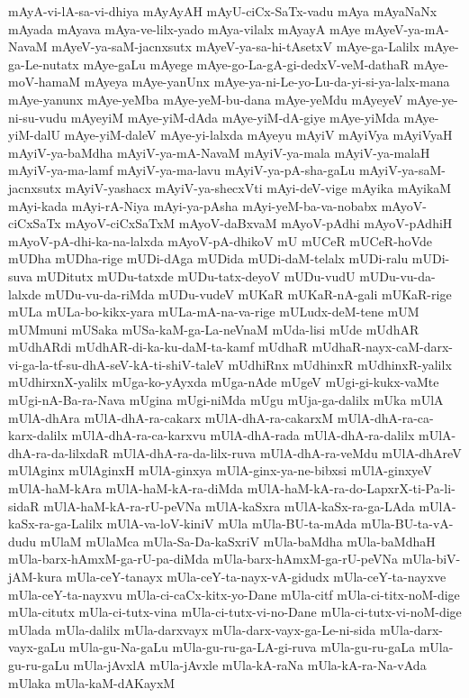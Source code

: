 {mAyA-vi-lA-sa-vi-dhiya
mAyAyAH
mAyU-ciCx-SaTx-vadu
mAya
mAyaNaNx
mAyada
mAyava
mAya-ve-lilx-yado
mAya-vilalx
mAyayA
mAye
mAyeV-ya-mA-NavaM
mAyeV-ya-saM-jacnxsutx
mAyeV-ya-sa-hi-tAsetxV
mAye-ga-Lalilx
mAye-ga-Le-nutatx
mAye-gaLu
mAyege
mAye-go-La-gA-gi-dedxV-veM-dathaR
mAye-moV-hamaM
mAyeya
mAye-yanUnx
mAye-ya-ni-Le-yo-Lu-da-yi-si-ya-lalx-mana
mAye-yanunx
mAye-yeMba
mAye-yeM-bu-dana
mAye-yeMdu
mAyeyeV
mAye-ye-ni-su-vudu
mAyeyiM
mAye-yiM-dAda
mAye-yiM-dA-giye
mAye-yiMda
mAye-yiM-dalU
mAye-yiM-daleV
mAye-yi-lalxda
mAyeyu
mAyiV
mAyiVya
mAyiVyaH
mAyiV-ya-baMdha
mAyiV-ya-mA-NavaM
mAyiV-ya-mala
mAyiV-ya-malaH
mAyiV-ya-ma-lamf
mAyiV-ya-ma-lavu
mAyiV-ya-pA-sha-gaLu
mAyiV-ya-saM-jacnxsutx
mAyiV-yashacx
mAyiV-ya-shecxVti
mAyi-deV-vige
mAyika
mAyikaM
mAyi-kada
mAyi-rA-Niya
mAyi-ya-pAsha
mAyi-yeM-ba-va-nobabx
mAyoV-ciCxSaTx
mAyoV-ciCxSaTxM
mAyoV-daBxvaM
mAyoV-pAdhi
mAyoV-pAdhiH
mAyoV-pA-dhi-ka-na-lalxda
mAyoV-pA-dhikoV
mU
mUCeR
mUCeR-hoVde
mUDha
mUDha-rige
mUDi-dAga
mUDida
mUDi-daM-telalx
mUDi-ralu
mUDi-suva
mUDitutx
mUDu-tatxde
mUDu-tatx-deyoV
mUDu-vudU
mUDu-vu-da-lalxde
mUDu-vu-da-riMda
mUDu-vudeV
mUKaR
mUKaR-nA-gali
mUKaR-rige
mULa
mULa-bo-kikx-yara
mULa-mA-na-va-rige
mULudx-deM-tene
mUM
mUMmuni
mUSaka
mUSa-kaM-ga-La-neVnaM
mUda-lisi
mUde
mUdhAR
mUdhARdi
mUdhAR-di-ka-ku-daM-ta-kamf
mUdhaR
mUdhaR-nayx-caM-darx-vi-ga-la-tf-su-dhA-seV-kA-ti-shiV-taleV
mUdhiRnx
mUdhinxR
mUdhinxR-yalilx
mUdhirxnX-yalilx
mUga-ko-yAyxda
mUga-nAde
mUgeV
mUgi-gi-kukx-vaMte
mUgi-nA-Ba-ra-Nava
mUgina
mUgi-niMda
mUgu
mUja-ga-dalilx
mUka
mUlA
mUlA-dhAra
mUlA-dhA-ra-cakarx
mUlA-dhA-ra-cakarxM
mUlA-dhA-ra-ca-karx-dalilx
mUlA-dhA-ra-ca-karxvu
mUlA-dhA-rada
mUlA-dhA-ra-dalilx
mUlA-dhA-ra-da-lilxdaR
mUlA-dhA-ra-da-lilx-ruva
mUlA-dhA-ra-veMdu
mUlA-dhAreV
mUlAginx
mUlAginxH
mUlA-ginxya
mUlA-ginx-ya-ne-bibxsi
mUlA-ginxyeV
mUlA-haM-kAra
mUlA-haM-kA-ra-diMda
mUlA-haM-kA-ra-do-LapxrX-ti-Pa-li-sidaR
mUlA-haM-kA-ra-rU-peVNa
mUlA-kaSxra
mUlA-kaSx-ra-ga-LAda
mUlA-kaSx-ra-ga-Lalilx
mUlA-va-loV-kiniV
mUla
mUla-BU-ta-mAda
mUla-BU-ta-vA-dudu
mUlaM
mUlaMca
mUla-Sa-Da-kaSxriV
mUla-baMdha
mUla-baMdhaH
mUla-barx-hAmxM-ga-rU-pa-diMda
mUla-barx-hAmxM-ga-rU-peVNa
mUla-biV-jAM-kura
mUla-ceY-tanayx
mUla-ceY-ta-nayx-vA-gidudx
mUla-ceY-ta-nayxve
mUla-ceY-ta-nayxvu
mUla-ci-caCx-kitx-yo-Dane
mUla-citf
mUla-ci-titx-noM-dige
mUla-citutx
mUla-ci-tutx-vina
mUla-ci-tutx-vi-no-Dane
mUla-ci-tutx-vi-noM-dige
mUlada
mUla-dalilx
mUla-darxvayx
mUla-darx-vayx-ga-Le-ni-sida
mUla-darx-vayx-gaLu
mUla-gu-Na-gaLu
mUla-gu-ru-ga-LA-gi-ruva
mUla-gu-ru-gaLa
mUla-gu-ru-gaLu
mUla-jAvxlA
mUla-jAvxle
mUla-kA-raNa
mUla-kA-ra-Na-vAda
mUlaka
mUla-kaM-dAKayxM
}
